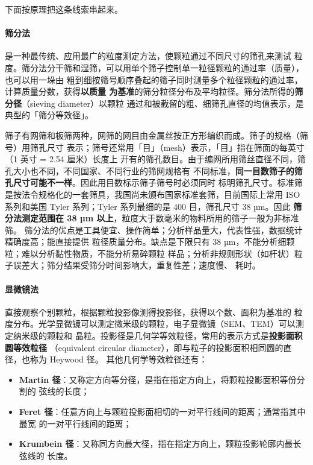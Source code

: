 下面按原理把这条线索串起来。

\paragraph{筛分法}是一种最传统、应用最广的粒度测定方法，使颗粒通过不同尺寸的筛孔来测试
粒度。筛分法分干筛和湿筛，可以用单个筛子控制单一粒径颗粒的通过率（质量），也可以用一垛由
粗到细按筛号顺序叠起的筛子同时测量多个粒径颗粒的通过率，计算质量分数，获得\textbf{以质量
为基准}的筛分粒径分布及平均粒径。筛分法所得的\textbf{筛分径}（sieving diameter）以颗粒
通过和被截留的粗、细筛孔直径的均值表示，是典型的「筛分等效径」。

筛子有网筛和板筛两种，网筛的网目由金属丝按正方形编织而成。筛子的规格（筛号）用筛孔尺寸
表示；筛号还常用「目」（mesh）表示，「目」指在筛面的每英寸（1 英寸 = 2.54 厘米）长度上
开有的筛孔数目。由于编网所用筛丝直径不同，筛孔大小也不同，不同国家、不同行业的筛网规格有
不同标准，\textbf{同一目数筛子的筛孔尺寸可能不一样}。因此用目数标示筛子筛号时必须同时
标明筛孔尺寸。标准筛是按法令规格化的一套筛具，我国尚未颁布国家标准套筛，目前国际上常用
ISO 系列和美国 Tyler 系列；Tyler 系列最细的是 400 目，筛孔尺寸 38 µm。因此
\textbf{筛分法测定范围在 38 µm 以上}，粒度大于数毫米的物料所用的筛子一般为非标准筛。
筛分法的优点是工具便宜、操作简单；分析样品量大，代表性强，数据统计精确度高；能直接提供
粒径质量分布。缺点是下限只有 38 µm，不能分析细颗粒；难以分析黏性物质，不能分析易碎颗粒
样品；分析非规则形状（如杆状）粒子误差大；筛分结果受筛分时间影响大，重复性差；速度慢、
耗时。

\paragraph{显微镜法}直接观察个别颗粒，根据颗粒投影像测得投影径，获得以个数、面积为基准的
粒度分布。光学显微镜可以测定微米级的颗粒，电子显微镜（SEM、TEM）可以测定纳米级的颗粒和
晶粒。投影径是几何学等效粒径，常用的表示方式是\textbf{投影面积圆等效粒径}
（equivalent circular diameter），即与粒子的投影面积相同圆的直径，也称为 Heywood 径。
其他几何学等效粒径还有：

\begin{itemize}
\item \textbf{Martin 径}：又称定方向等分径，是指在指定方向上，将颗粒投影面积等份分割的
弦线的长度；
\item \textbf{Feret 径}：任意方向上与颗粒投影面相切的一对平行线间的距离；通常指其中最宽
的一对平行线间的距离；
\item \textbf{Krumbein 径}：又称同方向最大径，指在指定方向上，颗粒投影轮廓内最长弦线的
长度。
\end{itemize}

